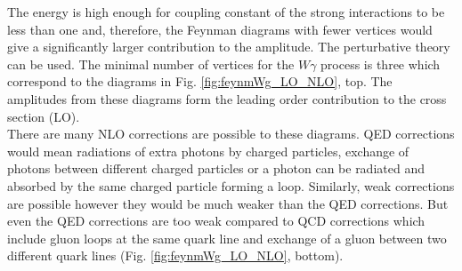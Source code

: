The energy is high enough for coupling constant of the strong interactions to be less than one and, therefore, the Feynman diagrams with fewer vertices would give a significantly larger contribution to the amplitude. The perturbative theory can be used. The minimal number of vertices for the $W\gamma$ process is three which correspond to the diagrams in Fig. \ref{fig:feynmWg_LO_NLO}, top. The amplitudes from these diagrams form the leading order contribution to the cross section (LO).\\ 

There are many NLO corrections are possible to these diagrams. QED corrections would mean radiations of extra photons by charged particles, exchange of photons between different charged particles or a photon can be radiated and absorbed by the same charged particle forming a loop. Similarly, weak corrections are possible however they would be much weaker than the QED corrections. But even the QED corrections are too weak compared to QCD corrections which include gluon loops at the same quark line and exchange of a gluon between two different quark lines (Fig. \ref{fig:feynmWg_LO_NLO}, bottom).\\

